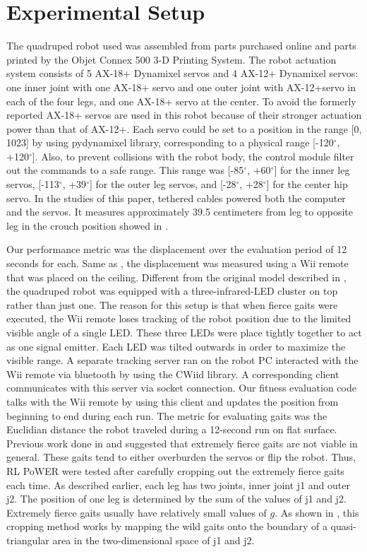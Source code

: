 \section{Experimental Setup}

The quadruped robot used was assembled from parts purchased online and
parts printed by the Objet Connex 500 3-D Printing System. The robot
actuation system consists of 5 AX-18+ Dynamixel servos and 4 AX-12+
Dynamixel servos: one inner joint with one AX-18+ servo and one outer
joint with AX-12+servo in each of the four legs, and one AX-18+ servo
at the center. To avoid the formerly reported  AX-18+ servos are used
in this robot because of their stronger actuation power than that of
AX-12+. Each servo could be set to a position in the range [0, 1023]
by using pydynamixel library, corresponding to a physical range [-120$^\circ$,
  +120$^\circ$]. Also, to prevent collisions with the robot body, the control
module filter out the commands to a safe range. This range was [-85$^\circ$,
  +60$^\circ$] for the inner leg servos, [-113$^\circ$, +39$^\circ$] for the outer leg
servos, and [-28$^\circ$, +28$^\circ$] for the center hip servo. In the studies of
this paper, tethered cables powered both the computer and the
servos. It measures approximately 39.5 centimeters from leg to
opposite leg in the crouch position showed in . 

Our performance metric was the displacement over the evaluation period of 12 seconds
for each. Same as \cite{yosinski2011evolving-robot-gaits}, the displacement was
measured using a Wii remote that was placed on the ceiling. Different
from the original model described in \cite{yosinski2011evolving-robot-gaits}, the quadruped robot was
equipped with a three-infrared-LED cluster on top rather than just
one. The reason for this setup is that when fierce gaits were
executed, the Wii remote loses tracking of the robot position due to
the limited visible angle of a single LED.  These three LEDs were
place tightly together to act as one signal emitter. Each LED was
tilted outwards in order to maximize the visible range. A
separate tracking server ran on the robot PC interacted with the Wii
remote via bluetooth by using the CWiid library.  A corresponding
client communicates with this server via socket connection. Our
fitness evaluation code talks with the Wii remote by using this client
and updates the position from beginning to end during each run. The
metric for evaluating gaits was the Euclidian distance the robot
traveled during a 12-second run on flat surface. Previous work done in
\cite{yosinski2011evolving-robot-gaits} and \cite{clune2009evolving-coordinated-quadruped} suggested that extremely fierce gaits are not viable in
general. These gaits tend to either overburden the servos or flip the
robot. Thus, RL PoWER were tested after carefully cropping out the
extremely fierce gaits each time. As described earlier, each leg has
two joints, inner joint j1 and outer j2. The position of one leg is
determined by the sum of the values of j1 and j2. Extremely fierce
gaits usually have relatively small values of $g$. As shown in , this cropping method works
by mapping the wild gaits onto the boundary of a quasi-triangular area in
the two-dimensional space of j1 and j2.

